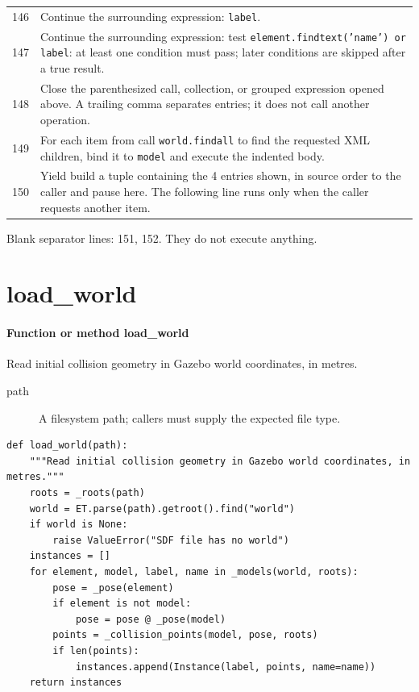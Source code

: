\documentclass[11pt,a4paper]{book}
\begin{document}
\begin{longtable}{r p{}}
146 & Continue the surrounding expression: \texttt{label}. \\

147 & Continue the surrounding expression: test \texttt{element.findtext('name') or label}: at least one condition must pass; later conditions are skipped after a true result. \\

148 & Close the parenthesized call, collection, or grouped expression opened above. A trailing comma separates entries; it does not call another operation. \\

149 & For each item from call \texttt{world.findall} to find the requested XML children, bind it to \texttt{model} and execute the indented body. \\

150 & Yield build a tuple containing the 4 entries shown, in source order to the caller and pause here. The following line runs only when the caller requests another item. \\

\end{longtable}

Blank separator lines: 151, 152. They do not execute anything.

\section{load\_world}

\paragraph{Function or method load\_world}
Read initial collision geometry in Gazebo world coordinates, in metres.

\begin{description}
\item[path] A filesystem path; callers must supply the expected file type.
\end{description}

\begin{lstlisting}[firstnumber=153]
def load_world(path):
    """Read initial collision geometry in Gazebo world coordinates, in metres."""
    roots = _roots(path)
    world = ET.parse(path).getroot().find("world")
    if world is None:
        raise ValueError("SDF file has no world")
    instances = []
    for element, model, label, name in _models(world, roots):
        pose = _pose(element)
        if element is not model:
            pose = pose @ _pose(model)
        points = _collision_points(model, pose, roots)
        if len(points):
            instances.append(Instance(label, points, name=name))
    return instances
\end{lstlisting}
\end{document}
